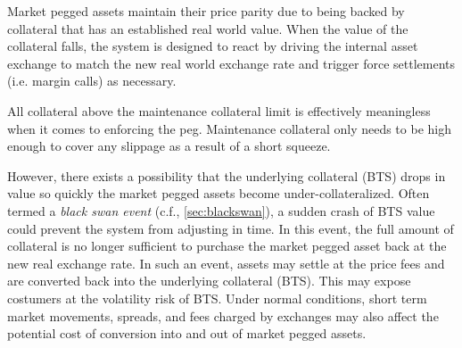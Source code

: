 Market pegged assets maintain their price parity due to being backed by
collateral that has an established real world value. When the value of the
collateral falls, the system is designed to react by driving the internal asset
exchange to match the new real world exchange rate and trigger force
settlements (i.e. margin calls) as necessary.

All collateral above the maintenance collateral limit is effectively
meaningless when it comes to enforcing the peg. Maintenance collateral only
needs to be high enough to cover any slippage as a result of a short squeeze.

However, there exists a possibility that the underlying collateral (BTS) drops
in value so quickly the market pegged assets become under-collateralized. Often
termed a \emph{black swan event} (c.f., \cref{sec:blackswan}), a sudden crash
of BTS value could prevent the system from adjusting in time. In this event,
the full amount of collateral is no longer sufficient to purchase the market
pegged asset back at the new real exchange rate. In such an event, assets may
settle at the price fees and are converted back into the underlying collateral
(BTS). This may expose costumers at the volatility risk of BTS. Under normal
conditions, short term market movements, spreads, and fees charged by exchanges
may also affect the potential cost of conversion into and out of market pegged
assets.
